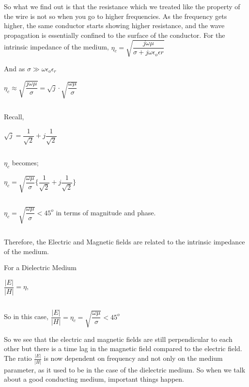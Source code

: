 So what we find out is that the resistance which we treated like the property of the wire is not so when you go to higher frequencies. As the frequency gets higher, the same conductor starts showing higher resistance, and the wave propagation is essentially confined to the surface of the conductor.
For the intrinsic impedance of the medium, $\eta_{c}=\sqrt{\dfrac{j\omega\mu}{\sigma+j\omega\epsilon_{o}\epsilon{r}}}$

And as $\sigma\gg\omega\epsilon_{o}\epsilon_{r}$
\begin{center}
$\eta_{c}\approx\sqrt{\dfrac{j\omega\mu}{\sigma}}=\sqrt{j}\cdot\sqrt{\dfrac{\omega\mu}{\sigma}}$
\end{center}
\begin{equation}\end{equation}

Recall,
\begin{center}
$\sqrt{j}=\dfrac{1}{\sqrt{2}}+j\dfrac{1}{\sqrt{2}}$
\end{center}
\begin{equation}\end{equation}

$\eta_{c}$ becomes;
\begin{center}
$\eta_{c}=\sqrt{\dfrac{\omega\mu}{\sigma}}\Bigg\{\dfrac{1}{\sqrt{2}}+j\dfrac{1}{\sqrt{2}}\Bigg\}$
\end{center} 
\begin{equation}\end{equation}

\begin{center}
$\eta_{c}=\sqrt{\dfrac{\omega\mu}{\sigma}}<45^{o}$ in terms of magnitude and phase.
\end{center}
\begin{equation}\end{equation}

Therefore, the Electric and Magnetic fields are related to the intrinsic impedance of the medium.

For a Dielectric Medium
\begin{center}
$\dfrac{|E|}{|H|}=\eta,$
\end{center}
\begin{equation}\end{equation}

So in this case, $\dfrac{|E|}{|H|}=\eta_{c}=\sqrt{\dfrac{\omega\mu}{\sigma}}<45^{o}$

So we see that the electric and magnetic fields are still perpendicular to each other but there is a time lag in the magnetic field compared to the electric field. The ratio $\frac{|E|}{|H|}$ is now dependent on frequency and not only on the medium parameter, as it used to be in the case of the dielectric medium. So when we talk about a good conducting medium, important things happen.

